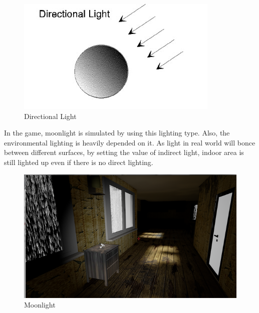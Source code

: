 \documentclass{article}
\begin{document}
\begin{figure}[hp!]
\centering
\includegraphics[scale=0.6]{directional_light.jpg}
\caption{Directional Light}
\label{fig:directional_light}
\end{figure}
\smallskip

In the game, moonlight is simulated by using this lighting type. Also, the environmental lighting is heavily depended on it. As light in real world will bonce between different surfaces, by setting the value of indirect light, indoor area is still lighted up even if there is no direct lighting.\\ 
\begin{figure}[hp!]
\centering
\includegraphics[scale=0.6]{moonlight.png}
\caption{Moonlight}
\label{fig:moonlight}
\end{figure}

\clearpage
\end{document}
